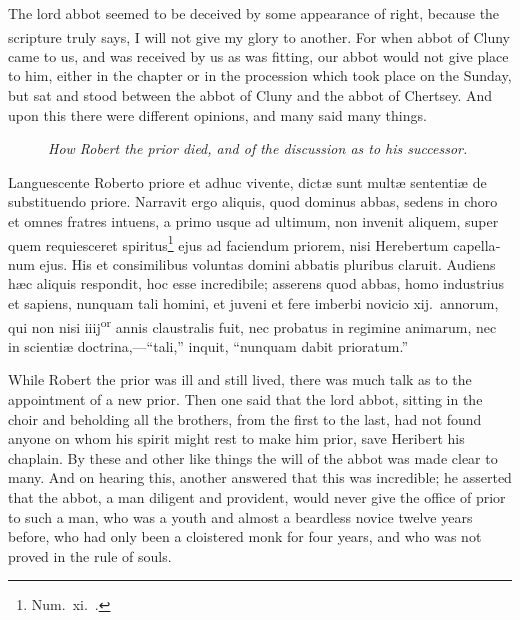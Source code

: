 \documentclass[10pt]{book}
\newcounter{engnote}
\newcommand{\engnotenum}{\textsuperscript{\arabic{engnote}\stepcounter{engnote}}}
\newcommand{\blockhead}[4][]{
\begin{figure}
\centering
\vspace{#4}
\parbox{2.75cm}{\begin{center}\footnotesize \color{BrickRed} \emph{#2}\\ #1 \end{center}}
\end{figure}
}
\begin{document}
\begin{paracol}{2}
\begin{otherlanguage}{latin}
\end{otherlanguage}

\switchcolumn

The lord abbot seemed to be deceived by some appearance of right, because the scripture truly says, I will not give my glory to another.\engnotenum{} For when abbot of Cluny\engnotenum{} came to us, and was received by us as was fitting, our abbot would not give place to him, either in the chapter or in the procession which took place on the Sunday, but sat and stood between the abbot of Cluny and the abbot of Chertsey. And upon this there were different opinions, and many said many things.

\switchcolumn*

\begin{otherlanguage}{latin}
\blockhead{How Robert the prior died, and of the discussion as to his successor.}{4}{-.45cm}
Languescente Roberto priore et adhuc vivente, dict\ae{} sunt mult\ae{} sententi\ae{} de substituendo priore. Narravit ergo aliquis, quod dominus abbas, sedens in choro et omnes fratres intuens, a primo usque ad ultimum, non invenit aliquem, super quem requiesceret spiritus\footnote[\ddag]{Num.\ xi.\ .} ejus ad faciendum priorem, nisi Herebertum capellanum ejus. His et consimilibus voluntas domini abbatis pluribus claruit. Audiens h\ae{}c aliquis respondit, hoc esse incredibile; asserens quod abbas, homo industrius et sapiens, nunquam tali homini, et juveni et fere imberbi novicio xij.\ annorum, qui non nisi iiij\textsuperscript{or} annis claustralis fuit, nec probatus in regimine animarum, nec in scienti\ae{} doctrina,---``tali,'' inquit, ``nunquam dabit prioratum.''

\end{otherlanguage}

\switchcolumn

While Robert the prior was ill and still lived, there was much talk as to the appointment of a new prior. Then one said that the lord abbot, sitting in the choir and beholding all the brothers, from the first to the last, had not found anyone on whom his spirit might rest to make him prior, save Heribert his chaplain. By these and other like things the will of the abbot was made clear to many. And on hearing this, another answered that this was incredible; he asserted that the abbot, a man diligent and provident, would never give the office of prior to such a man, who was a youth and almost a beardless novice twelve years before, who had only been a cloistered monk for four years, and who was not proved in the rule of souls.


\end{paracol}
\end{document}
